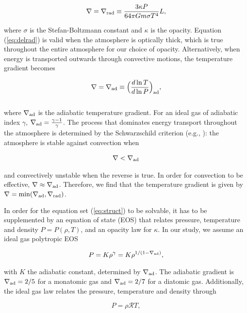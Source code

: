 \documentclass[apj]{emulateapj}
\newcommand{\delad}{\nabla_{\rm ad}}
\newcommand{\delrad}{\nabla_{\rm rad}}
\begin{document}
\begin{equation}
\label{eq:delrad}
\nabla = \delrad \equiv \frac{3 \kappa P}{64 \pi G m \sigma T^4} L,
\end{equation}

\noindent where $\sigma$ is the Stefan-Boltzmann constant and $\kappa$ is the opacity. Equation (\ref{eq:delrad}) is valid when the atmosphere is optically thick, which is true throughout the entire atmosphere for our choice of opacity. Alternatively, when energy is transported outwards through convective motions, the temperature gradient becomes


\begin{equation}
\label{eq:delad}
\nabla = \delad \equiv \Big(\frac{d \ln T}{d \ln P}\Big)_{\mathrm{ad}},
\end{equation}
\\

\noindent where $\delad$ is the adiabatic temperature gradient. For an ideal gas of adiabatic index $\gamma$, $\delad=\frac{\gamma-1}{\gamma}$. The process that dominates energy transport throughout the atmosphere is determined by the Schwarzschild criterion (e.g., \citealt{thompson06}): the atmosphere is stable against convection when

\begin{equation}
\label{eq:schwarz}
\nabla < \delad
\end{equation}

\noindent and convectively unstable when the reverse is true. In order for convection to be effective, $\nabla \approx \delad$. Therefore, we find that the temperature gradient is given by $\nabla=\mathrm{min}(\delad, \delrad)$. 

In order for the equation set (\ref{eq:struct}) to be solvable, it has to be supplemented by an equation of state (EOS) that relates pressure, temperature and density $P=P(\rho, T)$, and an opacity law for $\kappa$. In our study, we assume an ideal gas polytropic EOS 

\begin{equation}
\label{eq:polyEOS}
P=K \rho^{\gamma}=K \rho^{1/(1-\delad)},
\end{equation}

\noindent with $K$ the adiabatic constant, determined by $\delad$. The adiabatic gradient is $\delad=2/5$ for a monatomic gas and $\delad=2/7$ for a diatomic gas. Additionally, the ideal gas law relates the pressure, temperature and density through

\begin{equation}
\label{eq:idealgas}
P=\rho \mathcal{R} T,
\end{equation}
\end{document}
